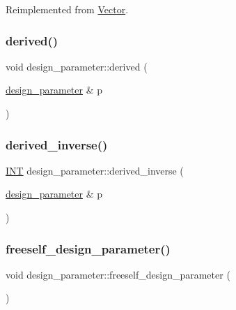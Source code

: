 Reimplemented from \mbox{\hyperlink{class_vector_af657307f3d344c8cef5d633335a5f484}{Vector}}.

\mbox{\label{classdesign__parameter_a72b457aff4b3747f90ed7fbda1941de0}} 
\subsubsection{\texorpdfstring{derived()}{derived()}}
{\footnotesize\ttfamily void design\+\_\+parameter\+::derived (\begin{DoxyParamCaption}\item[{\mbox{\hyperlink{classdesign__parameter}{design\+\_\+parameter}} \&}]{p }\end{DoxyParamCaption})}

\mbox{\label{classdesign__parameter_acbfce2a35f0c379d5888acdc8d74ae19}} 
\subsubsection{\texorpdfstring{derived\+\_\+inverse()}{derived\_inverse()}}
{\footnotesize\ttfamily \mbox{\hyperlink{galois_8h_a09fddde158a3a20bd2dcadb609de11dc}{I\+NT}} design\+\_\+parameter\+::derived\+\_\+inverse (\begin{DoxyParamCaption}\item[{\mbox{\hyperlink{classdesign__parameter}{design\+\_\+parameter}} \&}]{p }\end{DoxyParamCaption})}

\mbox{\label{classdesign__parameter_a0e7274960527530080b673a9d9e53fed}} 
\subsubsection{\texorpdfstring{freeself\+\_\+design\+\_\+parameter()}{freeself\_design\_parameter()}}
{\footnotesize\ttfamily void design\+\_\+parameter\+::freeself\+\_\+design\+\_\+parameter (\begin{DoxyParamCaption}{ }\end{DoxyParamCaption})}

